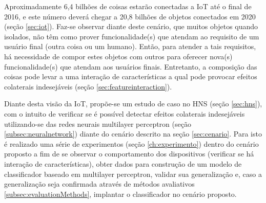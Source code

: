 Aproximadamente 6,4 bilhões de coisas estarão conectadas a IoT até o final de 2016, e este número deverá chegar a 20,8 bilhões de objetos conectados em 2020 (seção \ref{sec:iot}). Faz-se observar diante deste cenário, que muitos objetos quando isolados, não têm como prover funcionalidade(s) que atendam ao requisito de um usuário final (outra coisa ou um humano). Então, para atender a tais requisitos, há necessidade de compor estes objetos com outros para oferecer nova(s) funcionalidade(s) que atendam aos usuários finais. Entretanto, a composição das coisas pode levar a uma interação de características a qual pode provocar efeitos colaterais indesejáveis (seção \ref{sec:featureinteraction}).

Diante desta visão da IoT, propõe-se um estudo de caso no HNS (seção \ref{sec:hns}), com o intuito de verificar se é possível detectar efeitos colaterais indesejáveis utilizando-se das redes neurais multilayer perceptron (seção \ref{subsec:neuralnetwork}) diante do cenário descrito na seção \ref{sec:cenario}. Para isto é realizado uma série de experimentos (seção \ref{ch:experimento}) dentro do cenário proposto a fim de se observar o comportamento dos dispositivos (verificar se há interação de características), obter dados para construção de um modelo de classificador baseado em multilayer perceptron, validar sua generalização e, caso a generalização seja confirmada através de métodos avaliativos \ref{subsec:evaluationMethods}, implantar o classificador no cenário proposto.